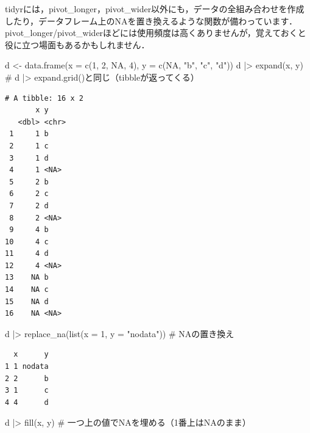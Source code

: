 \documentclass[
  letterpaper,
  DIV=11,
  numbers=noendperiod]{scrreprt}
\newenvironment{Shaded}{\begin{snugshade}}{\end{snugshade}}
\newcommand{\AttributeTok}[1]{\textcolor[rgb]{0.40,0.45,0.13}{#1}}
\newcommand{\CommentTok}[1]{\textcolor[rgb]{0.37,0.37,0.37}{#1}}
\newcommand{\ConstantTok}[1]{\textcolor[rgb]{0.56,0.35,0.01}{#1}}
\newcommand{\DecValTok}[1]{\textcolor[rgb]{0.68,0.00,0.00}{#1}}
\newcommand{\FunctionTok}[1]{\textcolor[rgb]{0.28,0.35,0.67}{#1}}
\newcommand{\NormalTok}[1]{\textcolor[rgb]{0.00,0.23,0.31}{#1}}
\newcommand{\OtherTok}[1]{\textcolor[rgb]{0.00,0.23,0.31}{#1}}
\newcommand{\SpecialCharTok}[1]{\textcolor[rgb]{0.37,0.37,0.37}{#1}}
\newcommand{\StringTok}[1]{\textcolor[rgb]{0.13,0.47,0.30}{#1}}
\begin{document}
tidyrには，pivot\_longer，pivot\_wider以外にも，データの全組み合わせを作成したり，データフレーム上のNAを置き換えるような関数が備わっています．pivot\_longer/pivot\_widerほどには使用頻度は高くありませんが，覚えておくと役に立つ場面もあるかもしれません．

\begin{Shaded}
\begin{Highlighting}[]
\NormalTok{d }\OtherTok{\textless{}{-}} \FunctionTok{data.frame}\NormalTok{(}\AttributeTok{x =} \FunctionTok{c}\NormalTok{(}\DecValTok{1}\NormalTok{, }\DecValTok{2}\NormalTok{, }\ConstantTok{NA}\NormalTok{, }\DecValTok{4}\NormalTok{), }\AttributeTok{y =} \FunctionTok{c}\NormalTok{(}\ConstantTok{NA}\NormalTok{, }\StringTok{"b"}\NormalTok{, }\StringTok{"c"}\NormalTok{, }\StringTok{"d"}\NormalTok{))}
\NormalTok{d }\SpecialCharTok{|\textgreater{}} \FunctionTok{expand}\NormalTok{(x, y) }\CommentTok{\# d |\textgreater{} expand.grid()と同じ（tibbleが返ってくる）}
\end{Highlighting}
\end{Shaded}

\begin{verbatim}
# A tibble: 16 x 2
       x y    
   <dbl> <chr>
 1     1 b    
 2     1 c    
 3     1 d    
 4     1 <NA> 
 5     2 b    
 6     2 c    
 7     2 d    
 8     2 <NA> 
 9     4 b    
10     4 c    
11     4 d    
12     4 <NA> 
13    NA b    
14    NA c    
15    NA d    
16    NA <NA> 
\end{verbatim}

\begin{Shaded}
\begin{Highlighting}[]
\NormalTok{d }\SpecialCharTok{|\textgreater{}} \FunctionTok{replace\_na}\NormalTok{(}\FunctionTok{list}\NormalTok{(}\AttributeTok{x =} \DecValTok{1}\NormalTok{, }\AttributeTok{y =} \StringTok{"nodata"}\NormalTok{)) }\CommentTok{\# NAの置き換え}
\end{Highlighting}
\end{Shaded}

\begin{verbatim}
  x      y
1 1 nodata
2 2      b
3 1      c
4 4      d
\end{verbatim}

\begin{Shaded}
\begin{Highlighting}[]
\NormalTok{d }\SpecialCharTok{|\textgreater{}} \FunctionTok{fill}\NormalTok{(x, y) }\CommentTok{\# 一つ上の値でNAを埋める（1番上はNAのまま）}
\end{Highlighting}
\end{Shaded}
\end{document}
